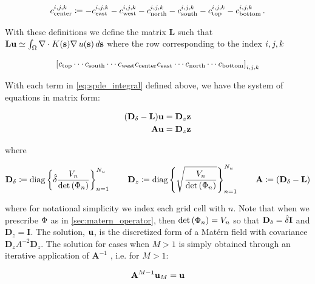 \begin{linenomath*}\begin{equation*}
    c_\text{center}^{i,j,k} \coloneqq
        - c_\text{east}^{i,j,k} - c_\text{west}^{i,j,k}
        - c_\text{north}^{i,j,k} - c_\text{south}^{i,j,k}
        - c_\text{top}^{i,j,k} - c_\text{bottom}^{i,j,k} \, .
\end{equation*}\end{linenomath*}
With these definitions we define the matrix $\mathbf{L}$ such that
$\mathbf{L} \mathbf{u} \simeq \int_{\Omega} \nabla\cdot K(\mathbf{s})\nabla \, u(\mathbf{s})\,d\mathbf{s}$
where the row corresponding to the index ${i,j,k}$
\begin{linenomath*}\begin{equation*}
    \left[ c_\text{top} \cdots c_\text{south} \cdots
           c_\text{west} c_\text{center} c_\text{east} \cdots
           c_\text{north} \cdots c_\text{bottom}
       \right]_{{i,j,k}}
\end{equation*}\end{linenomath*}

With each term in \cref{eq:spde_integral} defined above, we have the system of
equations in matrix form:
\begin{linenomath*}\begin{equation}
    \begin{aligned}
        (\mathbf{D}_\delta - \mathbf{L}) \mathbf{u} &= \mathbf{D}_z\mathbf{z}\\
        \mathbf{A}\mathbf{u} &= \mathbf{D}_z\mathbf{z}
    \end{aligned}
    \label{eq:fv_spde}
\end{equation}\end{linenomath*}
where
\begin{linenomath*}\begin{equation*}
    \begin{aligned}
        \mathbf{D}_\delta \coloneqq \text{diag}
            \left\{
                \hat{\delta}\dfrac{V_n}{\text{det}\left(\Phi_{n}\right)}
            \right\}_{n=1}^{N_{u}}
            \qquad
        \mathbf{D}_z \coloneqq \text{diag}
            \left\{
                \sqrt{\dfrac{V_n}{\text{det}\left(\Phi_{n}\right)}}
            \right\}_{n=1}^{N_{u}}
            \qquad
            \mathbf{A} \coloneqq \left(\mathbf{D}_\delta - \mathbf{L}\right)
    \end{aligned}
\end{equation*}\end{linenomath*}
where for notational simplicity we index each grid cell with $n$.
Note that when we prescribe $\Phi$ as in \cref{sec:matern_operator},
then $\text{det}\left(\Phi_{n}\right) = V_n$ so that $\mathbf{D}_\delta = \hat{\delta} \mathbf{I}$
and $\mathbf{D}_z = \mathbf{I}$.
The solution, $\mathbf{u}$, is the discretized form of a Mat\'ern field with
covariance $\mathbf{D}_z A^{-2} \mathbf{D}_z$.
The solution for cases when $M>1$ is simply obtained through an iterative
application of $\mathbf{A}^{-1}$ , i.e. for $M>1$:
\begin{linenomath*}\begin{equation*}
    \mathbf{A}^{M-1} \mathbf{u}_M = \mathbf{u}
\end{equation*}\end{linenomath*}



